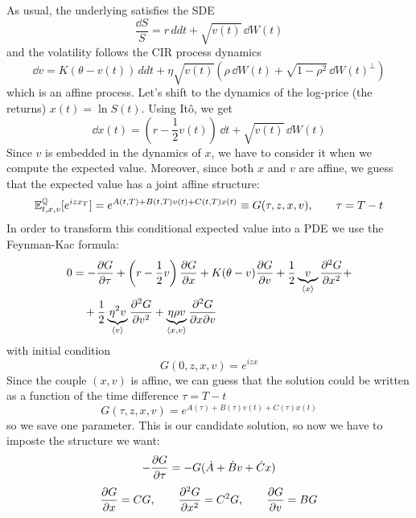  As usual, the underlying satisfies the SDE
\begin{equation*}
    \frac{\dd S}{S} = r\,dd t + \sqrt{v(t)}\,\dd W(t)
\end{equation*}
and the volatility follows the CIR process dynamics
\begin{equation}
    \dd v = K(\theta-v(t))\,dd t + \eta\sqrt{v(t)}(\rho\,\dd W(t) + \sqrt{1-\rho^2}\,\dd W(t)^{\perp})
\end{equation}
which is an affine process. Let's shift to the dynamics of the log-price (the returns) $x(t)=\ln S(t)$. Using Itô, we get
\begin{equation}
    \dd x(t) = \left(r-\frac{1}{2}v(t)\right)\,\dd t + \sqrt{v(t)}\,\dd W(t)
\end{equation}
Since $v$ is embedded in the dynamics of $x$, we have to consider it when we compute the expected value. Moreover, since both $x$ and $v$ are affine, we guess that the expected value has a joint affine structure:
\begin{equation}
    \mathbb{E}^{\mathbb{Q}}_{t,x,v}[e^{izx_T}] = e^{A(t,T)+B(t,T)v(t)+C(t,T)x(t)} \equiv G(\tau,z,x,v), \qquad \tau = T-t
\end{equation}
In order to transform this conditional expected value into a PDE we use the Feynman-Kac formula:
\begin{align}\label{FKh}
    \notag 0 &= - \pdv{G}{\tau} + \left(r-\frac{1}{2}v\right)\pdv{G}{x} + K(\theta-v)\pdv{G}{v} + \frac{1}{2}\underbrace{v}_{\expval{x}}\pdv[2]{G}{x} + \\
    &\quad + \frac{1}{2}\underbrace{\eta^2 v}_{\expval{v}}\pdv[2]{G}{v} + \underbrace{\eta\rho v}_{\expval{x,v}} \pdv{G}{x}{v}
\end{align}
with initial condition
\begin{equation*}
    G(0,z,x,v) = e^{izx}
\end{equation*}
Since the couple $(x,v)$ is affine, we can guess that the solution could be written as a function of the time difference $\tau=T-t$
\begin{equation*}
    G(\tau, z,x,v) = e^{A(\tau)+B(\tau)v(t)+C(\tau)x(t)}
\end{equation*}
so we save one parameter. This is our candidate solution, so now we have to imposte the structure we want:
\begin{align*}
    -\pdv{G}{\tau} = -G(\dot{A}+\dot{B}v+\dot{C}x)
\end{align*}
\begin{align*}
    \pdv{G}{x} = CG, \qquad \pdv[2]{G}{x} = C^2G, \qquad \pdv{G}{v} = BG
\end{align*}
